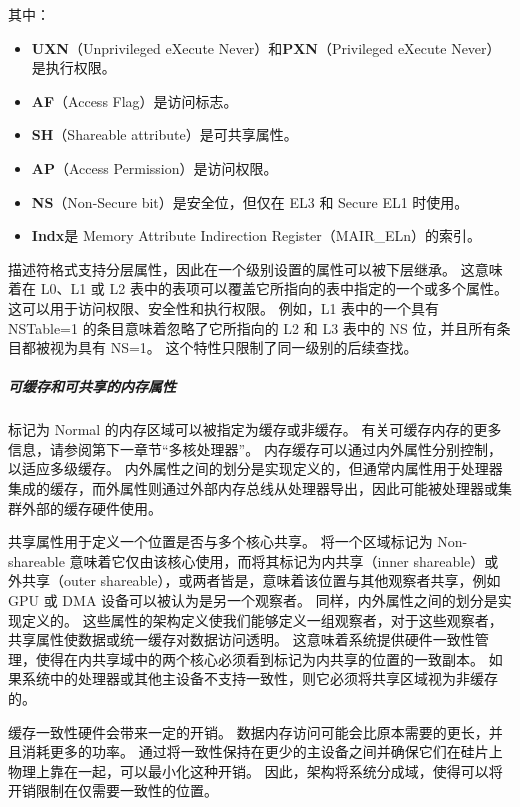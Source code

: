 
其中：

\begin{itemize}
\item
  \textbf{UXN}（Unprivileged eXecute Never）和\textbf{PXN}（Privileged
  eXecute Never）是执行权限。
\item
  \textbf{AF}（Access Flag）是访问标志。
\item
  \textbf{SH}（Shareable attribute）是可共享属性。
\item
  \textbf{AP}（Access Permission）是访问权限。
\item
  \textbf{NS}（Non-Secure bit）是安全位，但仅在 EL3 和 Secure EL1 时使用。
\item
  \textbf{Indx}是 Memory Attribute Indirection
  Register（MAIR\_ELn）的索引。
\end{itemize}

描述符格式支持分层属性，因此在一个级别设置的属性可以被下层继承。
这意味着在 L0、L1 或 L2 表中的表项可以覆盖它所指向的表中指定的一个或多个属性。
这可以用于访问权限、安全性和执行权限。
例如，L1 表中的一个具有 NSTable=1 的条目意味着忽略了它所指向的 L2 和 L3 表中的 NS 位，并且所有条目都被视为具有 NS=1。
这个特性只限制了同一级别的后续查找。

\subparagraph*{可缓存和可共享的内存属性}

标记为 Normal 的内存区域可以被指定为缓存或非缓存。
有关可缓存内存的更多信息，请参阅第下一章节“多核处理器”。
内存缓存可以通过内外属性分别控制，以适应多级缓存。
内外属性之间的划分是实现定义的，但通常内属性用于处理器集成的缓存，而外属性则通过外部内存总线从处理器导出，因此可能被处理器或集群外部的缓存硬件使用。

共享属性用于定义一个位置是否与多个核心共享。
将一个区域标记为 Non-shareable 意味着它仅由该核心使用，而将其标记为内共享（inner shareable）或外共享（outer shareable），或两者皆是，意味着该位置与其他观察者共享，例如 GPU 或 DMA 设备可以被认为是另一个观察者。
同样，内外属性之间的划分是实现定义的。
这些属性的架构定义使我们能够定义一组观察者，对于这些观察者，共享属性使数据或统一缓存对数据访问透明。
这意味着系统提供硬件一致性管理，使得在内共享域中的两个核心必须看到标记为内共享的位置的一致副本。
如果系统中的处理器或其他主设备不支持一致性，则它必须将共享区域视为非缓存的。


缓存一致性硬件会带来一定的开销。
数据内存访问可能会比原本需要的更长，并且消耗更多的功率。
通过将一致性保持在更少的主设备之间并确保它们在硅片上物理上靠在一起，可以最小化这种开销。
因此，架构将系统分成域，使得可以将开销限制在仅需要一致性的位置。


